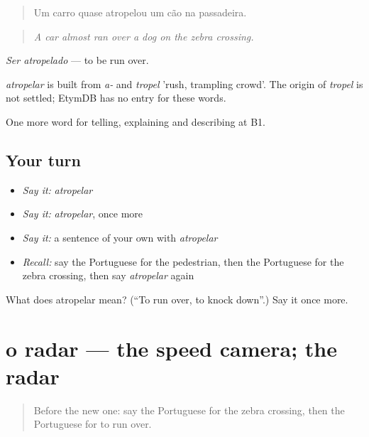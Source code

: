 \begin{quote}
Um carro quase atropelou um cão na passadeira.
\end{quote}

\begin{quote}
\emph{A car almost ran over a dog on the zebra crossing.}
\end{quote}

\emph{Ser atropelado} — to be run over.

\begin{cousinweb}
\emph{atropelar} is built from \emph{a-} and \emph{tropel} 'rush, trampling crowd'. The origin of \emph{tropel} is not settled; EtymDB has no entry for these words.
\end{cousinweb}

\begin{grammarlens}[title={What you've built}]
One more word for telling, explaining and describing at B1.
\end{grammarlens}

\subsection*{Your turn}
\begin{itemize}
\raggedright
  \item \emph{Say it:} \emph{atropelar}
  \item \emph{Say it:} \emph{atropelar}, once more
  \item \emph{Say it:} a sentence of your own with \emph{atropelar}
  \item \emph{Recall:} say the Portuguese for the pedestrian, then the Portuguese for the zebra crossing, then say \emph{atropelar} again
\end{itemize}

\begin{tcolorbox}[breakable,colback=teal!4,colframe=teal!35!black,title={Before you move on}]
What does atropelar mean? (\textquotedblleft{}To run over, to knock down\textquotedblright{}.) Say it once more.
\end{tcolorbox}
\section[o radar]{o radar — the speed camera; the radar}

\label{lesson:PT-C408-radar}



\begin{quote}
Before the new one: say the Portuguese for the zebra crossing, then the Portuguese for to run over.
\end{quote}

